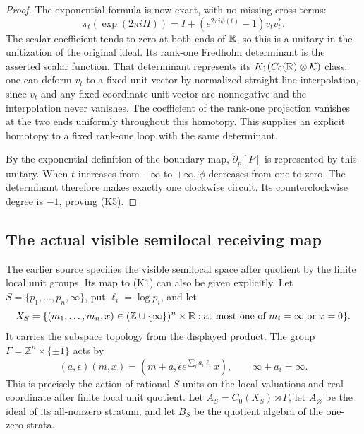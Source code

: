 \documentclass[11pt]{article}
\begin{document}
\begin{proof}
The exponential formula is now exact, with no missing cross terms:
\[
 \pi_t(\exp(2\pi iH))
   =I+(e^{2\pi i\phi(t)}-1)v_tv_t^*.
 \tag{K7}
\]
The scalar coefficient tends to zero at both ends of $\mathbb R$, so this
is a unitary in the unitization of the original ideal. Its rank-one
Fredholm determinant is the asserted scalar function. That determinant
represents its $K_1(C_0(\mathbb R)\otimes\mathcal K)$ class: one can deform
$v_t$ to a fixed unit vector by normalized straight-line interpolation,
since $v_t$ and any fixed coordinate unit vector are nonnegative and
the interpolation never vanishes. The coefficient of the rank-one
projection vanishes at the two ends uniformly throughout this homotopy.
This supplies an explicit homotopy to a fixed rank-one loop with the
same determinant.

By the exponential definition of the boundary map, $\partial_p[P]$
is represented by this unitary. When $t$ increases from $-\infty$ to
$+\infty$, $\phi$ decreases from one to zero. The determinant therefore
makes exactly one clockwise circuit. Its counterclockwise degree is
$-1$, proving (K5).
\end{proof}

\subsection*{The actual visible semilocal receiving map}
The earlier source specifies the visible semilocal space after quotient
by the finite local unit groups. Its map to (K1) can also be given
explicitly. Let $S=\{p_1,\ldots,p_n,\infty\}$, put
$\ell_i=\log p_i$, and let
\[
 X_S=\{(m_1,\ldots,m_n,x)\in
    (\mathbb Z\cup\{\infty\})^n\times\mathbb R:
    \text{at most one of }m_i=\infty\text{ or }x=0\}.
\]
It carries the subspace topology from the displayed product. The group
$\Gamma=\mathbb Z^n\times\{\pm1\}$ acts by
\[
 (a,\epsilon)(m,x)=
       (m+a,\epsilon e^{\sum_i a_i\ell_i}x),\qquad
 \infty+a_i=\infty.
 \tag{K8}
\]
This is precisely the action of rational $S$-units on the local
valuations and real coordinate after finite local unit quotient. Let
$A_S=C_0(X_S)\rtimes\Gamma$, let $A_\varnothing$ be the ideal of
its all-nonzero stratum, and let $B_S$ be the quotient algebra of the
one-zero strata.
\end{document}

